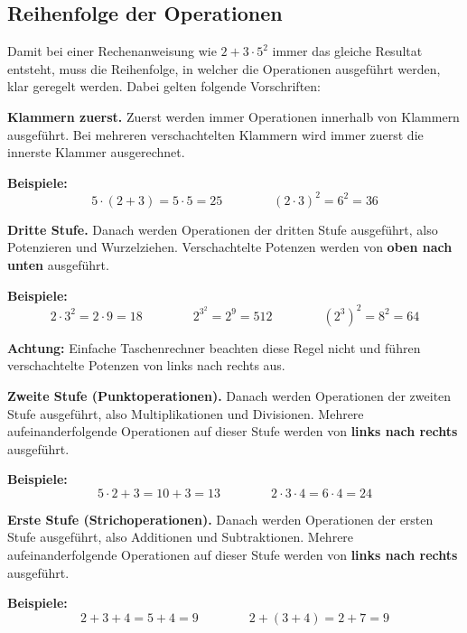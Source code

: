 \newpage
\subsection{Reihenfolge der Operationen}

Damit bei einer Rechenanweisung wie $2+3\cdot 5^{2}$ immer das gleiche Resultat entsteht, muss die Reihenfolge, in welcher die Operationen ausgeführt werden, klar geregelt werden. Dabei gelten folgende Vorschriften:

\textbf{Klammern zuerst.} Zuerst werden immer Operationen innerhalb von Klammern ausgeführt. Bei mehreren verschachtelten Klammern wird immer zuerst die innerste Klammer ausgerechnet.
\begin{example}
  \textbf{Beispiele:}
  \[
    5\cdot (2+3) = 5\cdot 5 = 25 \qquad\qquad (2\cdot 3)^{2} = 6^{2} = 36
  \]
\end{example}
\textbf{Dritte Stufe.} Danach werden Operationen der dritten Stufe ausgeführt, also Potenzieren und Wurzelziehen. Verschachtelte Potenzen werden von \textbf{oben nach unten} ausgeführt.
\begin{example}
  \textbf{Beispiele:}
  \[
    2\cdot 3^{2} = 2\cdot 9 = 18 \qquad\qquad 2^{3^{2}} = 2^{9} = 512 \qquad\qquad \left(2^{3}\right)^{2} = 8^{2} = 64
  \]
\end{example}
\begin{note}
  \textbf{Achtung:} Einfache Taschenrechner beachten diese Regel nicht und führen verschachtelte Potenzen von links nach rechts aus.
\end{note}
\textbf{Zweite Stufe (Punktoperationen).} Danach werden Operationen der zweiten Stufe ausgeführt, also Multiplikationen und Divisionen. Mehrere aufeinanderfolgende Operationen auf dieser Stufe werden von \textbf{links nach rechts} ausgeführt.
\begin{example}
  \textbf{Beispiele:}
  \[
    5\cdot 2+3 = 10+3 = 13 \qquad\qquad 2\cdot 3\cdot 4 = 6\cdot 4 = 24
  \]
\end{example}
\textbf{Erste Stufe (Strichoperationen).} Danach werden Operationen der ersten Stufe ausgeführt, also Additionen und Subtraktionen. Mehrere aufeinanderfolgende Operationen auf dieser Stufe werden von \textbf{links nach rechts} ausgeführt.
\begin{example}
  \textbf{Beispiele:}
  \[
    2+3+4 = 5+4 = 9 \qquad\qquad 2+(3+4) = 2+7 = 9
  \]
\end{example}
